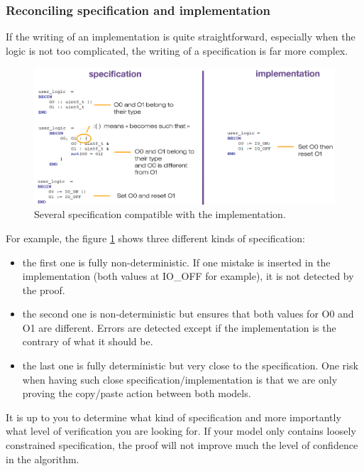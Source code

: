 \subsubsection{Reconciling specification and implementation}

If the writing of an implementation is quite straightforward, especially when the logic is not too complicated, the writing of a specification is far more complex. 
\begin{figure}[ht]
\centering\includegraphics[scale=0.30]{Pictures/chapterProgramming/subst-reconcile.png}
\caption{Several specification compatible with the implementation. }
\label{programming:subst-reconcile}
\end{figure}  
For example, the figure \ref{programming:subst-reconcile} shows three different kinds of specification:
\begin{itemize}
    \item the first one is fully non-deterministic. If one mistake is inserted in the implementation (both values at IO\_OFF for example), it is not detected by the proof.
    \item the second one is non-deterministic but ensures that both values for O0 and O1 are different. Errors are detected except if the implementation is the contrary of what it should be.
    \item the last one is fully deterministic but very close to the specification. One risk when having such close specification/implementation is that we are only proving the copy/paste action between both models.
\end{itemize}
It is up to you to determine what kind of specification and more importantly what level of verification you are looking for. If your model only contains loosely constrained specification, the proof will not improve much the level of confidence in the algorithm.
